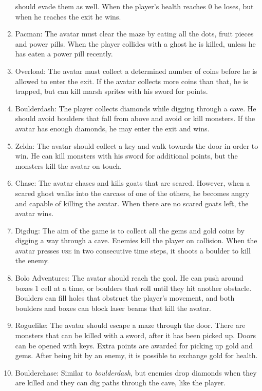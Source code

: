 \begin{enumerate}
		should evade them as well. When the player's health reaches 0 he loses,
		but when he reaches the exit he wins.
	\item Pacman:
		The avatar must clear the maze by eating all the dots, fruit pieces and
		power pills.  When the player collides with a ghost he is killed,
		unless he has eaten a power pill recently.
	\item Overload:
		The avatar must collect a determined number of coins before he is
		allowed to enter the exit. If the avatar collects more coins than that,
		he is trapped, but can kill marsh sprites with his sword for points.
	\item Boulderdash:
		The player collects diamonds while digging through a cave. He should
		avoid boulders that fall from above and avoid or kill monsters. If the
		avatar has enough diamonds, he may enter the exit and wins.
	\item Zelda:
		The avatar should collect a key and walk towards the door in order to
		win. He can kill monsters with his sword for additional points, but the
		monsters kill the avatar on touch.
	\item Chase:
		The avatar chases and kills goats that are scared. However, when a
		scared ghost walks into the carcass of one of the others, he becomes
		angry and capable of killing the avatar. When there are no scared goats
		left, the avatar wins.
	\item Digdug:
		The aim of the game is to collect all the gems and gold coins by digging
		a way through a cave. Enemies kill the player on collision. When the
		avatar presses \textsc{use} in two consecutive time steps, it shoots a boulder to
		kill the enemy.
	\item Bolo Adventures:
		The avatar should reach the goal. He can push around boxes 1 cell at a
		time, or boulders that roll until they hit another obstacle. Boulders
		can fill holes that obstruct the player's movement, and both boulders
		and boxes can block laser beams that kill the avatar.
	\item Roguelike:
		The avatar should escape a maze through the door. There are monsters
		that can be killed with a sword, after it has been picked up. Doors can
		be opened with keys. Extra points are awarded for picking up gold and
		gems. After being hit by an enemy, it is possible to exchange gold for
		health.
	\item Boulderchase:
		Similar to \textit{boulderdash}, but enemies drop diamonds when they are
		killed and they can dig paths through the cave, like the player.

\end{enumerate}
